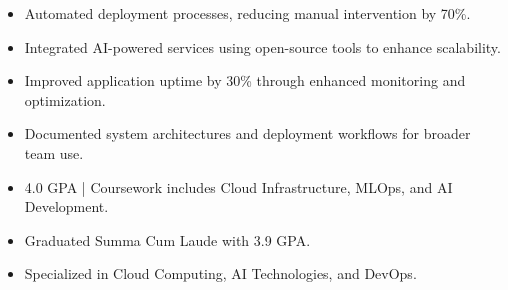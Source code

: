 \par\smallskip
\noindent
\begin{minipage}{20cm}
  \begin{minipage}{9.75cm}
    \begin{itemize}
      \item Automated deployment processes, reducing manual intervention by 70\%.
      \item Integrated AI-powered services using open-source tools to enhance scalability.
    \end{itemize}
  \end{minipage}
  \hfill
  \begin{minipage}{9.75cm}
    \begin{itemize}
      \item Improved application uptime by 30\% through enhanced monitoring and optimization.
      \item Documented system architectures and deployment workflows for broader team use.
    \end{itemize}
  \end{minipage}
\end{minipage}
\par\smallskip
\divider

\begin{itemize}
  \item 4.0 GPA | Coursework includes Cloud Infrastructure, MLOps, and AI Development.
\end{itemize}
\divider

\begin{itemize}
  \item Graduated Summa Cum Laude with 3.9 GPA.
  \item Specialized in Cloud Computing, AI Technologies, and DevOps.
\end{itemize}

\noindent
\begin{minipage}{20cm}
\end{minipage}


